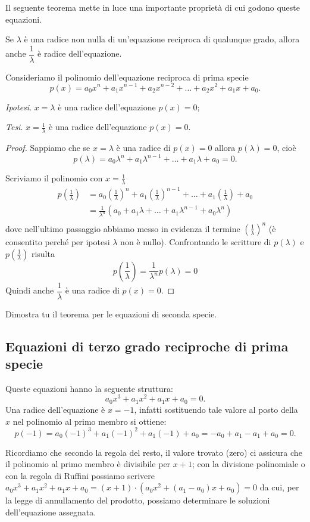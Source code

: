 Il seguente teorema mette in luce una importante proprietà di cui godono queste equazioni.
\begin{teorema}
Se $\lambda$ è una radice non nulla di un'equazione reciproca di qualunque grado, allora anche $\dfrac 1{\lambda}$ è radice dell'equazione.
\end{teorema}

Consideriamo il polinomio dell'equazione reciproca di prima specie
\[p(x)=a_0x^n+a_1x^{n-1}+a_2x^{n-2}+ \ldots +a_2x^2+a_1x+a_0.\]

\emph{Ipotesi}. $x=\lambda$ è una radice dell'equazione $p(x)=0$;

\emph{Tesi}. $x=\frac 1{\lambda}$ è una radice dell'equazione $p(x)=0$.
\begin{proof}
Sappiamo che se $x=\lambda$ è una radice di $p(x)=0$ allora $p(\lambda)=0$, cioè
\[p(\lambda)=a_0\lambda ^n+a_1\lambda ^{n-1}+\ldots +a_1\lambda +a_0=0.\]

Scriviamo il polinomio con $x=\frac 1{\lambda }$
\begin{align*}
p\left(\frac 1{\lambda }\right)&=a_0\left(\frac 1{\lambda }\right)^n+a_1\left(\frac 1{\lambda }\right)^{n-1}+\ldots +a_1\left(\frac 1{\lambda }\right)+a_0\\
&=\frac 1{\lambda ^n} \left(a_0+a_1\lambda +\ldots +a_1\lambda ^{n-1}+a_0\lambda ^n \right)\\
\end{align*}
dove nell'ultimo passaggio abbiamo messo in evidenza il termine $ \left(\frac 1{\lambda }\right)^n $ (è consentito perché per ipotesi $\lambda$ non è nullo). Confrontando le scritture di $p(\lambda)$ e $p\left(\frac 1{\lambda }\right)$ risulta
\[
p\left(\frac 1{\lambda }\right)=\frac 1{\lambda ^n} p(\lambda)=0
\]
Quindi anche $\dfrac 1{\lambda }$ è una radice di $p(x)=0$.
\end{proof}
Dimostra tu il teorema per le equazioni di seconda specie.

\subsection{Equazioni di terzo grado reciproche di prima specie}

Queste equazioni hanno la seguente struttura: \[a_0x^3+a_1x^2+a_1x+a_0=0.\]
Una radice dell'equazione è $x=-1$, infatti sostituendo tale valore al posto della $x$ nel polinomio al primo membro si ottiene: \[p(-1)=a_0(-1)^3+a_1(-1)^2+a_1(-1)+a_0=-a_0+a_1-a_1+a_0=0.\]

Ricordiamo che secondo la regola del resto, il valore trovato (zero) ci assicura che il polinomio al primo membro è divisibile per $x+1$; con la divisione polinomiale o con la regola di Ruffini possiamo scrivere $a_0x^3+a_1x^2+a_1x+a_0=(x+1)\cdot \left(a_0x^2+(a_1-a_0)x+a_0\right)=0$ da cui, per la legge di annullamento del prodotto, possiamo determinare le soluzioni dell'equazione assegnata.

